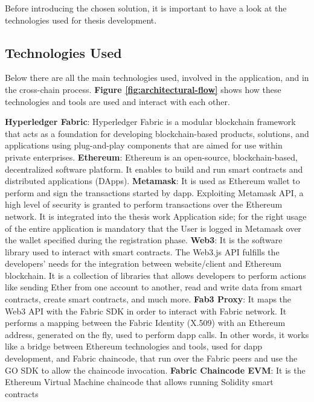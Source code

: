 Before introducing the chosen solution, it is important to have a look at the technologies used for 
thesis development. 

\subsection{Technologies Used}

Below there are all the main technologies used, involved in the application, and in the cross-chain process.
\textbf{Figure \ref{fig:architectural-flow}} shows how these technologies and tools are used and 
interact with each other. 

\begin{outline}
    \1 \textbf{Hyperledger Fabric}: Hyperledger Fabric is a modular blockchain framework that acts as a foundation for 
    developing blockchain-based products, solutions, and applications using plug-and-play components that are aimed for 
    use within private enterprises. 
    \1 \textbf{Ethereum}: Ethereum is an open-source, blockchain-based, decentralized software platform. It enables 
    to build and run smart contracts and distributed applications (DApps).
    \1 \textbf{Metamask}: It is used as Ethereum wallet to perform and sign the transactions started by dapp.
    Exploiting Metamask API, a high level of security is granted to perform transactions over the Ethereum network. 
    It is integrated into the thesis work Application side; for the right usage of the entire application is
    mandatory that the User is logged in Metamask over the wallet specified during the registration phase.  
    \1 \textbf{Web3}: It is the software library used to interact with smart contracts.
    The Web3.js API fulfills the developers' needs for the integration between website/client and Ethereum blockchain.
    It is a collection of libraries that allows developers to perform actions like sending Ether from one account to another, read 
    and write data from smart contracts, create smart contracts, and much more. 
    \1 \textbf{Fab3 Proxy}: It maps the Web3 API with the Fabric SDK in order to interact with
    Fabric network. It performs a mapping between the Fabric Identity (X.509) with an Ethereum address, generated on the fly,
    used to perform dapp calls. In other words, it works like a bridge between Ethereum technologies and tools, used 
    for dapp development, and Fabric chaincode, that run over the Fabric peers and use the GO SDK to allow 
    the chaincode invocation.  
    \1 \textbf{Fabric Chaincode EVM}: It is the Ethereum Virtual Machine chaincode that allows running Solidity smart contracts

\end{outline}
